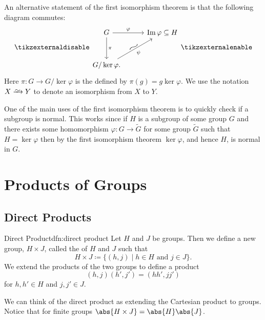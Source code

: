 An alternative statement of the first isomorphism theorem is that the following diagram commutes:
\begin{equation}
    \tikzexternaldisable
    \begin{tikzcd}[row sep=1cm, column sep=1cm]
        G \ar[r, "\varphi"]\ar[d, "\pi"] & \image \varphi \subseteq H\\
        G/\ker\varphi. \ar[ur, "\psi"', "\longsim"{anchor=south, rotate=30, inner sep=0.1em}]
    \end{tikzcd}
    \tikzexternalenable
\end{equation}
Here \(\pi \colon G \to G/\ker\varphi\) is the  defined by \(\pi(g) = g\ker\varphi\).
We use the notation \(X \xrightarrow{\smash{\raisebox{-0.75ex}{$\sim$}}} Y\) to denote an isomorphism from \(X\) to \(Y\).

One of the main uses of the first isomorphism theorem is to quickly check if a subgroup is normal.
This works since if \(H\) is a subgroup of some group \(G\) and there exists some homomorphism \(\varphi\colon G \to \tilde{G}\) for some group \(\tilde{G}\) such that \(H = \ker\varphi\) then by the first isomorphism theorem \(\ker\varphi\), and hence \(H\), is normal in \(G\).

\chapter{Products of Groups}
\section{Direct Products}
\begin{dfn}{Direct Product}{dfn:direct product}
    Let \(H\) and \(J\) be groups.
    Then we define a new group, \(H \times J\), called the  of \(H\) and \(J\) such that
    \begin{equation}
        H \times J \coloneqq \{(h, j) \mid h \in H \text{ and } j \in J\}.
    \end{equation}
    We extend the products of the two groups to define a product
    \begin{equation}
        (h, j)(h', j') = (hh', jj')
    \end{equation}
    for \(h, h' \in H\) and \(j, j' \in J\).
\end{dfn}

We can think of the direct product as extending the Cartesian product to groups.
Notice that for finite groups \(\abs{H\times J} = \abs{H}\abs{J}\).

